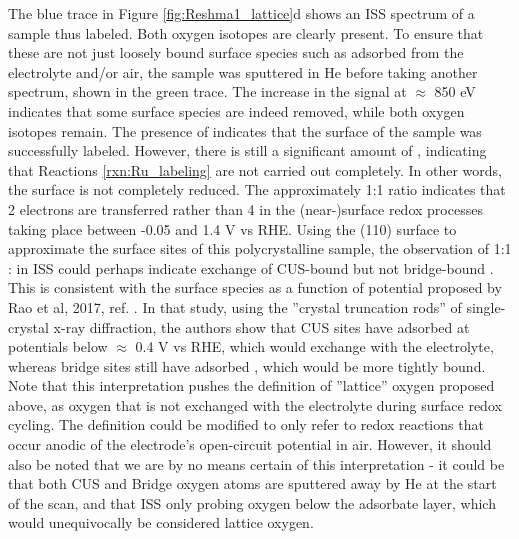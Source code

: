 The blue trace in Figure \ref{fig:Reshma1_lattice}d shows an ISS spectrum of a sample thus labeled. Both oxygen isotopes are clearly present. To ensure that these are not just loosely bound surface species such as adsorbed  from the electrolyte and/or air, the sample was sputtered in He before taking another spectrum, shown in the green trace. The increase in the  signal at $\approx$ 850 eV indicates that some surface species are indeed removed, while both oxygen isotopes remain. The presence of  indicates that the surface of the sample was successfully labeled. However, there is still a significant amount of , indicating that Reactions \ref{rxn:Ru_labeling} are not carried out completely. In other words, the surface is not completely reduced. The approximately 1:1 ratio indicates that 2 electrons are transferred rather than 4 in the (near-)surface redox processes taking place between -0.05 and 1.4 V vs RHE. Using the (110) surface to approximate the surface sites of this polycrystalline sample, the observation of 1:1 : in ISS could perhaps indicate exchange of CUS-bound  but not bridge-bound . This is consistent with the surface species as a function of potential proposed by Rao et al, 2017, ref. . In that study, using the ''crystal truncation rods'' of single-crystal x-ray diffraction, the authors show that CUS sites have adsorbed  at potentials below $\approx$ 0.4 V vs RHE, which would exchange with the electrolyte, whereas bridge sites still have adsorbed , which would be more tightly bound. Note that this interpretation pushes the definition of ''lattice'' oxygen proposed above, as oxygen that is not exchanged with the electrolyte during surface redox cycling. The definition could be modified to only refer to redox reactions that occur anodic of the electrode's open-circuit potential in air. However, it should also be noted that we are by no means certain of this interpretation - it could be that both CUS and Bridge oxygen atoms are sputtered away by He at the start of the scan, and that ISS only probing oxygen below the adsorbate layer, which would unequivocally be considered lattice oxygen.

